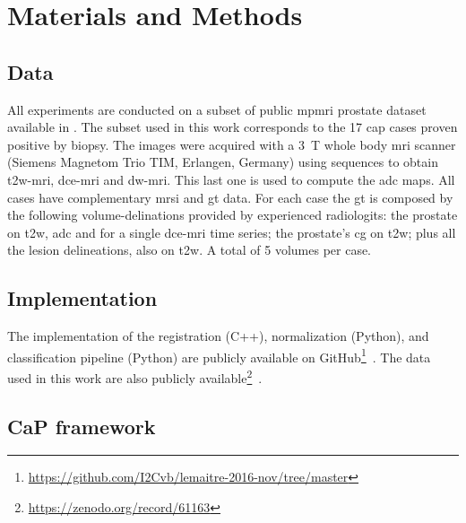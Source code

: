 \documentclass[num-refs]{wiley-article}
\begin{document}
\section{Materials and Methods} \label{sec:materials_and_methods}

\subsection{Data}\label{sec:data}

All experiments are conducted on a subset of public \ac{mpmri} prostate
dataset available in \cite{dataset}. The subset used in this work corresponds to
the 17 \ac{cap} cases proven positive by biopsy. The images were acquired with a
\SI{3}{\tesla} whole body \ac{mri} scanner (Siemens Magnetom Trio TIM, Erlangen,
Germany) using sequences to obtain \ac{t2w}-\ac{mri}, \ac{dce}-\ac{mri} and
\ac{dw}-\ac{mri}. This last one is used to compute the \ac{adc} maps.
All cases have complementary \ac{mrsi} and \ac{gt} data. 
%
For each case the \ac{gt} is composed by the following volume-delinations
provided by experienced radiologits: the prostate on \ac{t2w}, \ac{adc} and for
a single \ac{dce}-\ac{mri} time series; the prostate's \ac{cg} on \ac{t2w}; plus
all the lesion delineations, also on \ac{t2w}. A total of 5 volumes per case.

\subsection{Implementation}

The implementation of the registration (C++), normalization (Python), and classification pipeline (Python) are publicly available on GitHub\footnote{\url{https://github.com/I2Cvb/lemaitre-2016-nov/tree/master}}~\citep{lemaitre2016github}.
The data used in this work are also publicly available\footnote{\url{https://zenodo.org/record/61163}}~\citep{lemaitre2016dce}.

\subsection{CaP framework}
\label{sec:framework}
\begin{figure}
  \centering

\end{figure}


\end{document}
